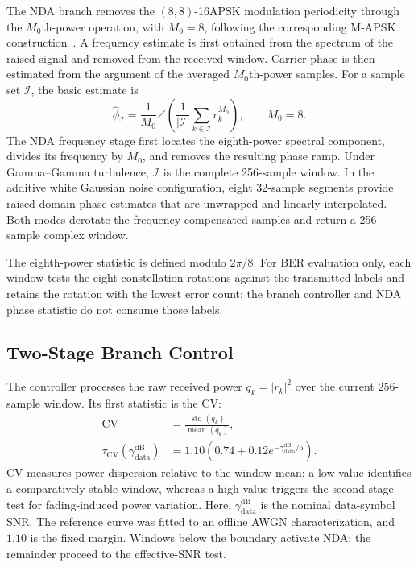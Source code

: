 The NDA branch removes the $(8,8)$-16APSK modulation periodicity through the $M_0$th-power operation, with $M_0=8$, following the corresponding M-APSK construction~\cite{du2025nda}. A frequency estimate is first obtained from the spectrum of the raised signal and removed from the received window. Carrier phase is then estimated from the argument of the averaged $M_0$th-power samples. For a sample set $\mathcal I$, the basic estimate is
\begin{equation}
\hat\phi_{\mathcal I}
=\frac{1}{M_0}\angle\!\left(
\frac{1}{|\mathcal I|}\sum_{k\in\mathcal I}r_k^{M_0}
\right),\qquad M_0=8.
\label{eq:nda-m0-phase}
\end{equation}
The NDA frequency stage first locates the eighth-power spectral component, divides its frequency by $M_0$, and removes the resulting phase ramp. Under Gamma--Gamma turbulence, $\mathcal I$ is the complete 256-sample window. In the additive white Gaussian noise configuration, eight 32-sample segments provide raised-domain phase estimates that are unwrapped and linearly interpolated. Both modes derotate the frequency-compensated samples and return a 256-sample complex window.

The eighth-power statistic is defined modulo $2\pi/8$. For BER evaluation only, each window tests the eight constellation rotations against the transmitted labels and retains the rotation with the lowest error count; the branch controller and NDA phase statistic do not consume those labels.

\subsection{Two-Stage Branch Control}

The controller processes the raw received power $q_k=|r_k|^2$ over the current 256-sample window. Its first statistic is the CV:
\begin{equation}
\begin{aligned}
\mathrm{CV}&=\frac{\operatorname{std}(q_k)}{\operatorname{mean}(q_k)},\\
\tau_{\mathrm{CV}}(\gamma_{\mathrm{data}}^{\mathrm{dB}})
&=1.10\left(0.74+0.12e^{-\gamma_{\mathrm{data}}^{\mathrm{dB}}/5}\right).
\end{aligned}
\label{eq:cv-decision-boundary}
\end{equation}
CV measures power dispersion relative to the window mean: a low value identifies a comparatively stable window, whereas a high value triggers the second-stage test for fading-induced power variation. Here, $\gamma_{\mathrm{data}}^{\mathrm{dB}}$ is the nominal data-symbol SNR. The reference curve was fitted to an offline AWGN characterization, and $1.10$ is the fixed margin. Windows below the boundary activate NDA; the remainder proceed to the effective-SNR test.

